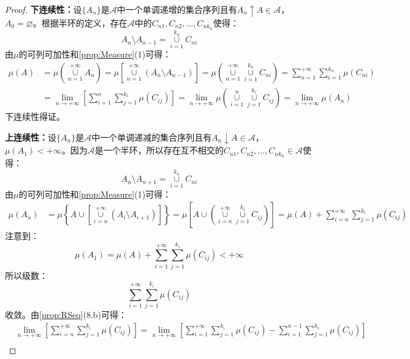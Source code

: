 \begin{proof}
	\textbf{下连续性：}设$\{A_n\}$是$\mathscr{A}$中一个单调递增的集合序列且有$A_n\uparrow A\in\mathscr{A}$，$A_0=\varnothing$。根据半环的定义，存在$\mathscr{A}$中的$C_{n1},C_{n2},\dots,C_{nk_n}$使得：
	\begin{equation*}
		A_n\setminus A_{n-1}=\underset{i=1}{\overset{k_n}{\cup}}C_{ni}
	\end{equation*}
	由$\mu$的可列可加性和\cref{prop:Measure}(1)可得：
	\begin{align*}
		\mu(A)&=\mu\left(\underset{n=1}{\overset{+\infty}{\cup}}A_n\right)
		=\mu\left[\underset{n=1}{\overset{+\infty}{\cup}}(A_{n}\setminus A_{n-1})\right]=\mu\left(\underset{n=1}{\overset{+\infty}{\cup}}\underset{i=1}{\overset{k_n}{\cup}}C_{ni}\right)=\sum_{n=1}^{+\infty}\sum_{i=1}^{k_n}\mu(C_{ni}) \\
		&=\lim_{n\to+\infty}\left[\sum_{i=1}^{n}\sum_{j=1}^{k_i}\mu(C_{ij})\right]=\lim_{n\to+\infty}\mu\left(\underset{i=1}{\overset{n}{\cup}}\underset{j=1}{\overset{k_i}{\cup}}C_{ij}\right)=\lim_{n\to+\infty}\mu(A_n)
	\end{align*}
	下连续性得证。\par
	\textbf{上连续性：}设$\{A_n\}$是$\mathscr{A}$中一个单调递减的集合序列且有$A_n\downarrow A\in\mathscr{A}$，$\mu(A_1)<+\infty$。因为$\mathscr{A}$是一个半环，所以存在互不相交的$C_{n1},C_{n2},\dots,C_{nk_n}\in\mathscr{A}$使得：
	\begin{equation*}
		A_n\setminus A_{n+1}=\underset{i=1}{\overset{k_n}{\cup}}C_{ni}
	\end{equation*}
	由$\mu$的可列可加性和\cref{prop:Measure}(1)可得：
	\begin{align*}
		\mu(A_n)&=\mu\left\{A\cup\left[\underset{i=n}{\overset{+\infty}{\cup}}(A_i\setminus A_{i+1})\right]\right\}=\mu\left[A\cup\left(\underset{i=n}{\overset{+\infty}{\cup}}\underset{j=1}{\overset{k_i}{\cup}}C_{ij}\right)\right]
		=\mu(A)+\sum_{i=n}^{+\infty}\sum_{j=1}^{k_i}\mu(C_{ij})
	\end{align*}
	注意到：
	\begin{equation*}
		\mu(A_1)=\mu(A)+\sum_{i=1}^{+\infty}\sum_{j=1}^{k_i}\mu(C_{ij})<+\infty
	\end{equation*}
	所以级数：
	\begin{equation*}
		\sum_{i=1}^{+\infty}\sum_{j=1}^{k_i}\mu(C_{ij})
	\end{equation*}
	收敛。由\cref{prop:RSeq}(8.b)可得：
	\begin{align*}
		&\lim_{n\to+\infty}\left[\sum_{i=n}^{+\infty}\sum_{j=1}^{k_i}\mu(C_{ij})\right]=\lim_{n\to+\infty}\left[\sum_{i=1}^{+\infty}\sum_{j=1}^{k_i}\mu(C_{ij})-\sum_{i=1}^{n-1}\sum_{j=1}^{k_i}\mu(C_{ij})\right] \\

\end{align*}
\end{proof}
